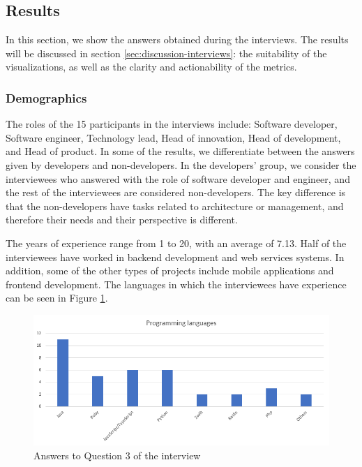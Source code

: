 \subsection{Results}
In this section, we show the answers obtained during the interviews. The results will be discussed in section \ref{sec:discussion-interviews}: the suitability of the visualizations, as well as the clarity and actionability of the metrics.

\subsubsection{Demographics}

The roles of the 15 participants in the interviews include: Software developer, Software engineer, Technology lead, Head of innovation, Head of development, and Head of product. In some of the results, we differentiate between the answers given by developers and non-developers. In the developers' group, we consider the interviewees who answered with the role of software developer and engineer, and the rest of the interviewees are considered non-developers. The key difference is that the non-developers have tasks related to architecture or management, and therefore their needs and their perspective is different.

The years of experience range from 1 to 20, with an average of 7.13. Half of the interviewees have worked in backend development and web services systems. In addition, some of the other types of projects include mobile applications and frontend development. The languages in which the interviewees have experience can be seen in Figure \ref{fig:interview-3}.

\begin{figure}[ht!]
\begin{center}
\includegraphics[width=\textwidth]{figures/interview/Question3.png}
\caption{Answers to Question 3 of the interview}
\label{fig:interview-3}
\end{center}
\end{figure}

